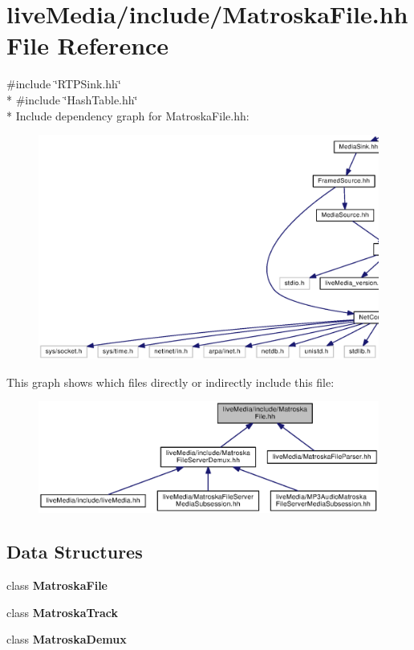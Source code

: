 \section{live\+Media/include/\+Matroska\+File.hh File Reference}
\label{MatroskaFile_8hh}
{\ttfamily \#include \char`\"{}R\+T\+P\+Sink.\+hh\char`\"{}}\\*
{\ttfamily \#include \char`\"{}Hash\+Table.\+hh\char`\"{}}\\*
Include dependency graph for Matroska\+File.\+hh\+:
\nopagebreak
\begin{figure}[H]
\begin{center}
\leavevmode
\includegraphics[width=350pt]{MatroskaFile_8hh__incl}
\end{center}
\end{figure}
This graph shows which files directly or indirectly include this file\+:
\nopagebreak
\begin{figure}[H]
\begin{center}
\leavevmode
\includegraphics[width=350pt]{MatroskaFile_8hh__dep__incl}
\end{center}
\end{figure}
\subsection*{Data Structures}
\begin{DoxyCompactItemize}
\item 
class {\bf Matroska\+File}
\item 
class {\bf Matroska\+Track}
\item 
class {\bf Matroska\+Demux}
\end{DoxyCompactItemize}
